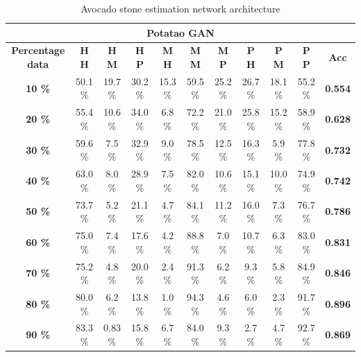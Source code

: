 \documentclass[11pt]{article}
\begin{document}
  \begin{table}[h!]
  \centering
  \begin{adjustbox}{max width=\textwidth}
  \begin{tabular}{*{11}{c}}%
  \hline
  \multicolumn{11}{c}{\textbf{Potatao GAN}}
  \\
 \hline
 \textbf{Percentage data} & \textbf{H H} & \textbf{H M} & \textbf{H P} & \textbf{M H} & \textbf{M M} & \textbf{M P} & \textbf{P H} & \textbf{P M} & \textbf{P P} & \textbf{Acc}\\
 \hline
 \hline
 \textbf{10 \%}  & 50.1 \% & 19.7 \% & 30.2 \% & 15.3 \% & 59.5 \% & 25.2 \% & 26.7 \% & 18.1 \% & 55.2 \% & \textbf{0.554} \\
 \hline
 \textbf{20 \%} & 55.4 \% & 10.6 \% & 34.0 \% & 6.8 \% & 72.2 \% & 21.0 \% & 25.8 \% & 15.2 \% & 58.9 \% & \textbf{0.628} \\
 \hline
 \textbf{30 \%} & 59.6 \% & 7.5 \% & 32.9 \% & 9.0 \% & 78.5 \% & 12.5 \% & 16.3 \% & 5.9 \% & 77.8 \% & \textbf{0.732} \\
 \hline
 \textbf{40 \%} & 63.0 \% & 8.0 \% & 28.9 \% & 7.5 \% & 82.0 \% & 10.6 \% & 15.1 \% & 10.0 \%  & 74.9 \% & \textbf{0.742} \\
 \hline
 \textbf{50 \%} & 73.7 \% & 5.2 \% & 21.1 \% & 4.7 \% & 84.1 \% & 11.2 \% & 16.0 \% & 7.3 \% & 76.7 \% & \textbf{0.786} \\
 \hline
 \textbf{60 \%} & 75.0 \% & 7.4 \% & 17.6 \% & 4.2 \% & 88.8 \% & 7.0 \% & 10.7 \% & 6.3 \% & 83.0 \% & \textbf{0.831} \\
 \hline
 \textbf{70 \%} & 75.2 \% & 4.8 \% & 20.0 \% & 2.4 \% & 91.3 \% & 6.2 \% & 9.3 \% & 5.8 \% & 84.9 \% & \textbf{0.846} \\
 \hline
\textbf{80 \%} & 80.0 \% & 6.2 \% & 13.8 \%  & 1.0 \% & 94.3 \% & 4.6 \% & 6.0 \% & 2.3 \% & 91.7 \% & \textbf{0.896} \\
 \hline
 \textbf{90 \%} & 83.3 \% & 0.83 \% & 15.8 \% & 6.7 \% & 84.0 \% & 9.3 \% & 2.7 \% & 4.7 \% & 92.7 \% & \textbf{0.869} \\
 \hline
\end{tabular}
\end{adjustbox}
  \caption{Avocado stone estimation network architecture}
  \label{tab:experiments_avo_cnn}
\end{table}
\end{document}
